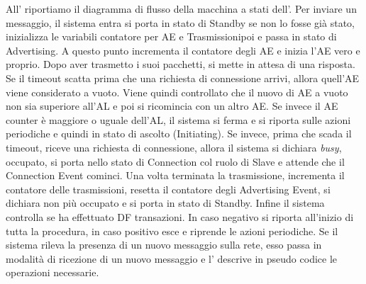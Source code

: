 All' riportiamo il diagramma di flusso della macchina a stati dell'. Per inviare un messaggio, il sistema entra si porta in stato di Standby se non lo fosse già stato, inizializza le variabili contatore per \acf{AE} e Trasmissionipoi e passa in stato di Advertising. A questo punto incrementa il contatore degli \acl{AE} e inizia l'\acs{AE} vero e proprio. Dopo aver trasmetto i suoi pacchetti, si mette in attesa di una risposta. Se il timeout scatta prima che una richiesta di connessione arrivi, allora quell'AE viene considerato a vuoto. Viene quindi controllato che il nuovo di AE a vuoto non sia superiore all'AL e poi si ricomincia con un altro AE. Se invece il AE counter è maggiore o uguale dell'AL, il sistema si ferma e si riporta sulle azioni periodiche e quindi in stato di ascolto (Initiating). Se invece, prima che scada il timeout, riceve una richiesta di connessione, allora il sistema si dichiara \textit{busy}, occupato, si porta nello stato di Connection col ruolo di Slave e attende che il Connection Event cominci. Una volta terminata la trasmissione, incrementa il contatore delle trasmissioni, resetta il contatore degli Advertising Event, si dichiara non più occupato e si porta in stato di Standby. Infine il sistema controlla se ha effettuato DF transazioni. In caso negativo si riporta all'inizio di tutta la procedura, in caso positivo esce e riprende le azioni periodiche.
Se il sistema rileva la presenza di un nuovo messaggio sulla rete, esso passa in modalità di ricezione di un nuovo messaggio e l' descrive in pseudo codice le operazioni necessarie. 

